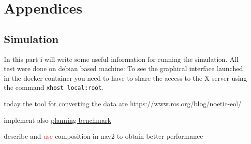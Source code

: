 \part{Appendices}
\chapter{Simulation}
In this part i will write some useful information for running the simulation.
All test were done on debian based machine:
To see the graphical interface launched in the docker container you need to have to share the access to the X server using the command \texttt{xhost local:root}.


today the tool for converting the data are 
\href{https://www.ros.org/blog/noetic-eol/}{https://www.ros.org/blog/noetic-eol/}

implement also \href{https://github.com/ros-navigation/navigation2/tree/main/tools/planner\_benchmarking}{planning benchmark}

describe and \textcolor{red}{use} composition in nav2 to obtain better performance \cite{10132508}
